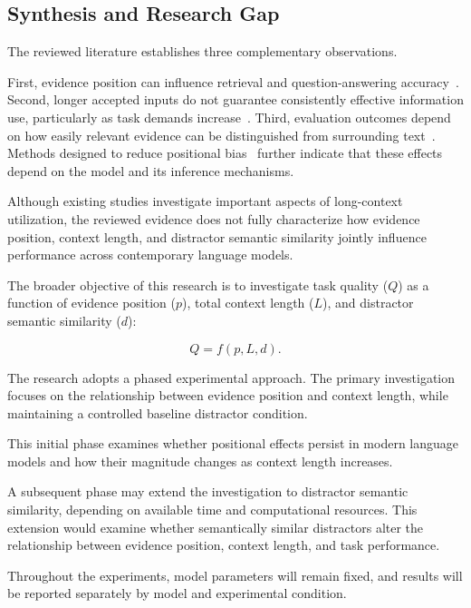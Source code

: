 \subsection{Synthesis and Research Gap}

The reviewed literature establishes three complementary observations.

First, evidence position can influence retrieval and question-answering
accuracy~\cite{liu2024lost}. Second, longer accepted inputs do not guarantee
consistently effective information use, particularly as task demands
increase~\cite{bai2024longbench,hsieh2024ruler}. Third, evaluation outcomes
depend on how easily relevant evidence can be distinguished from surrounding
text~\cite{modarressi2025nolima}. Methods designed to reduce positional
bias~\cite{hsieh2024found,zhang2024found} further indicate that these effects
depend on the model and its inference mechanisms.

Although existing studies investigate important aspects of long-context
utilization, the reviewed evidence does not fully characterize how evidence
position, context length, and distractor semantic similarity jointly influence
performance across contemporary language models.

The broader objective of this research is to investigate task quality ($Q$) as
a function of evidence position ($p$), total context length ($L$), and
distractor semantic similarity ($d$):

\begin{equation}
    Q = f(p,L,d).
    \label{eq:context-utilization}
\end{equation}

The research adopts a phased experimental approach. The primary investigation
focuses on the relationship between evidence position and context length, while
maintaining a controlled baseline distractor condition.

This initial phase examines whether positional effects persist in modern
language models and how their magnitude changes as context length increases.

A subsequent phase may extend the investigation to distractor semantic
similarity, depending on available time and computational resources. This
extension would examine whether semantically similar distractors alter the
relationship between evidence position, context length, and task performance.

Throughout the experiments, model parameters will remain fixed, and results
will be reported separately by model and experimental condition.
